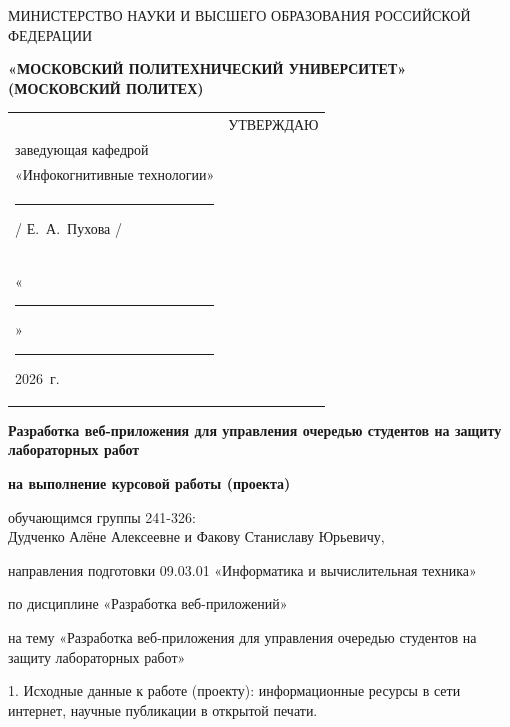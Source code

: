 \documentclass[14pt, a4paper]{extarticle}
\begin{document}
\pagestyle{empty}


\begin{center}
    {\small МИНИСТЕРСТВО НАУКИ И ВЫСШЕГО ОБРАЗОВАНИЯ РОССИЙСКОЙ ФЕДЕРАЦИИ}


    {\small \textbf{«МОСКОВСКИЙ ПОЛИТЕХНИЧЕСКИЙ УНИВЕРСИТЕТ»}} \\
    {\small \textbf{(МОСКОВСКИЙ ПОЛИТЕХ)}}
\end{center}

\begin{tabularx}{\textwidth}{@{} p{} p{} @{}}
    &
    \raggedright
    УТВЕРЖДАЮ                          \\
    заведующая кафедрой                \\
    «Инфокогнитивные технологии»       \\[0.3cm]

    \rule{3cm}{0.4pt} / Е.~А.~Пухова / \\[0.1cm]

    «\rule{0.8cm}{0.4pt}» \rule{3cm}{0.4pt} 2026~г.
\end{tabularx}


\begin{center}
    { \large \textbf{Разработка веб-приложения для управления очередью студентов на защиту лабораторных работ}}

    \textbf{на выполнение курсовой работы (проекта)}

    обучающимся группы 241-326: \\
    Дудченко Алёне Алексеевне и Факову Станиславу Юрьевичу,

    направления подготовки 09.03.01 «Информатика и вычислительная техника»

    по дисциплине «Разработка веб-приложений»

    на тему «Разработка веб-приложения для управления очередью студентов на защиту лабораторных работ»
\end{center}

1. Исходные данные к работе (проекту): информационные ресурсы в сети интернет, научные публикации в открытой печати.
\end{document}
